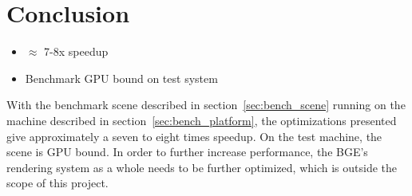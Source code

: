 \section{Conclusion}
\ifsummaries
\begin{itemize}
 \item $\approx$ 7-8x speedup
 \item Benchmark GPU bound on test system
\end{itemize}
\fi

With the benchmark scene described in section~\ref{sec:bench_scene} running on the machine described in section~\ref{sec:bench_platform}, the optimizations presented give approximately a seven to eight times speedup. On the test machine, the scene is GPU bound. In order to further increase performance, the BGE's rendering system as a whole needs to be further optimized, which is outside the scope of this project.


